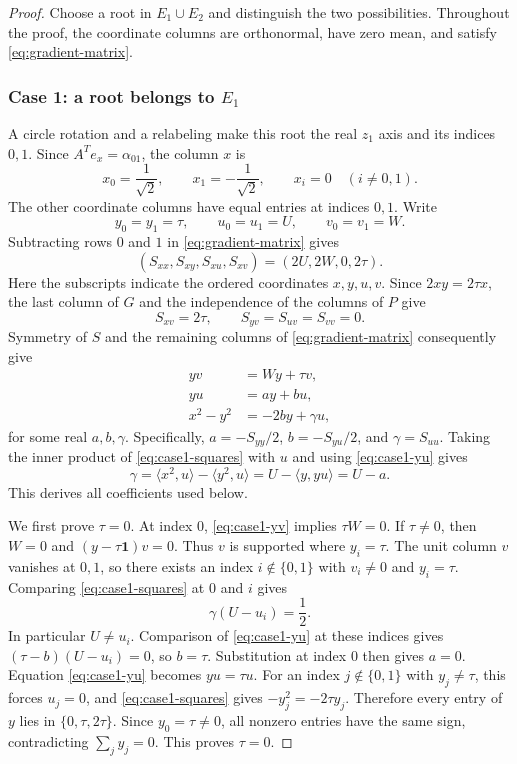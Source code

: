\documentclass[11pt,reqno]{amsart}
\theoremstyle{definition}
\theoremstyle{remark}
\numberwithin{equation}{section}
\newcommand{\one}{\mathbf 1}
\newcommand{\ip}[2]{\langle #1,#2\rangle}
\begin{document}
\begin{proof}
Choose a root in $E_1\cup E_2$ and distinguish the two possibilities.
Throughout the proof, the coordinate columns are orthonormal,
have zero mean, and satisfy \eqref{eq:gradient-matrix}.

\subsubsection*{Case 1: a root belongs to $E_1$}
A circle rotation and a relabeling make this root the real $z_1$
axis and its indices $0,1$. Since $A^Te_x=\alpha_{01}$, the
column $x$ is
\[
 x_0=\frac1{\sqrt2},\qquad x_1=-\frac1{\sqrt2},\qquad
 x_i=0\quad(i\ne0,1).
\]
The other coordinate columns have equal entries at indices $0,1$.
Write
\[
 y_0=y_1=\tau,\qquad u_0=u_1=U,\qquad v_0=v_1=W.
\]
Subtracting rows $0$ and $1$ in \eqref{eq:gradient-matrix} gives
\begin{equation}\label{eq:case1-first-row}
 (S_{xx},S_{xy},S_{xu},S_{xv})=(2U,2W,0,2\tau).
\end{equation}
Here the subscripts indicate the ordered coordinates $x,y,u,v$.
Since $2xy=2\tau x$, the last column of $G$ and the independence
of the columns of $P$ give
\[
 S_{xv}=2\tau,\qquad S_{yv}=S_{uv}=S_{vv}=0.
\]
Symmetry of $S$ and the remaining columns of
\eqref{eq:gradient-matrix} consequently give
\begin{align}
 yv&=Wy+\tau v,\label{eq:case1-yv}\\
 yu&=a y+b u,\label{eq:case1-yu}\\
 x^2-y^2&=-2b y+\gamma u,\label{eq:case1-squares}
\end{align}
for some real $a,b,\gamma$. Specifically,
$a=-S_{yy}/2$, $b=-S_{yu}/2$, and $\gamma=S_{uu}$.
Taking the inner product of \eqref{eq:case1-squares} with $u$
and using \eqref{eq:case1-yu} gives
\begin{equation}\label{eq:case1-gamma}
 \gamma=\ip{x^2}{u}-\ip{y^2}{u}
        =U-\ip{y}{yu}=U-a.
\end{equation}
This derives all coefficients used below.

We first prove $\tau=0$. At index $0$, \eqref{eq:case1-yv}
implies $\tau W=0$. If $\tau\ne0$, then $W=0$ and
$(y-\tau\one)v=0$. Thus $v$ is supported where $y_i=\tau$.
The unit column $v$ vanishes at $0,1$, so there exists an index
$i\notin\{0,1\}$ with $v_i\ne0$ and $y_i=\tau$.
Comparing \eqref{eq:case1-squares} at $0$ and $i$ gives
\[
 \gamma(U-u_i)=\frac12.
\]
In particular $U\ne u_i$. Comparison of \eqref{eq:case1-yu}
at these indices gives $(\tau-b)(U-u_i)=0$, so $b=\tau$.
Substitution at index $0$ then gives $a=0$.
Equation \eqref{eq:case1-yu} becomes $yu=\tau u$.
For an index $j\notin\{0,1\}$ with $y_j\ne\tau$, this forces
$u_j=0$, and \eqref{eq:case1-squares} gives
$-y_j^2=-2\tau y_j$. Therefore every entry of $y$ lies in
$\{0,\tau,2\tau\}$. Since $y_0=\tau\ne0$, all nonzero entries
have the same sign, contradicting $\sum_jy_j=0$.
This proves $\tau=0$.


\end{proof}
\end{document}
